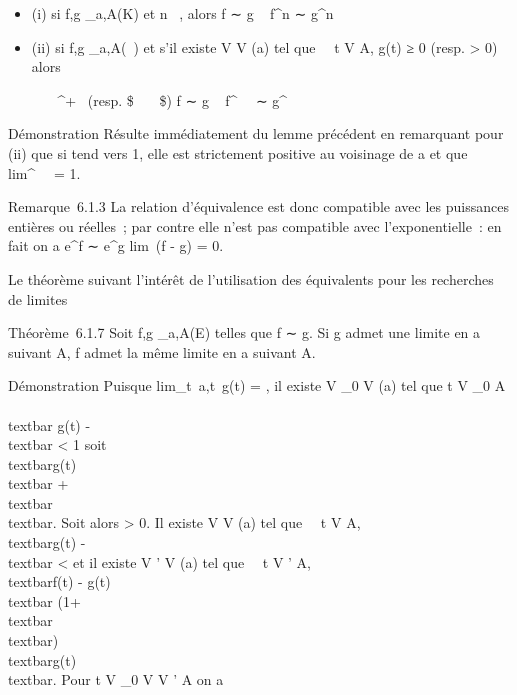 \documentclass[]{article}
\begin{document}
\begin{itemize}
\item
  (i) si f,g \_a,A(K) et n \in {}~, alors f ∼ g \rigtharrow~ f^n ∼
  g^n
\item
  (ii) si f,g \_a,A(~) et s'il existe V \in V (a) tel que
  \forall~~t \in V \bigcap A, g(t) ≥ 0 (resp. \textgreater{}
  0) alors

  \forall~\alpha~ \in {}~^+~\text
  (resp. \$\forall~\alpha~ \in {}~\$) f ∼ g \rigtharrow~ f^\alpha~~
  ∼ g^\alpha~
\end{itemize}

Démonstration Résulte immédiatement du lemme précédent en remarquant
pour (ii) que si \phi tend vers 1, elle est strictement positive au
voisinage de a et que lim\phi^\alpha~~ = 1.

Remarque~6.1.3 La relation d'équivalence est donc compatible avec les
puissances entières ou réelles~; par contre elle n'est pas compatible
avec l'exponentielle~: en fait on a e^f ∼ e^g
\Leftrightarrow lim~(f - g) = 0.

Le théorème suivant \jmathustifie l'intérêt de l'utilisation des équivalents
pour les recherches de limites

Théorème~6.1.7 Soit f,g \_a,A(E) telles que f ∼ g. Si g admet
une limite \ell en a suivant A, f admet la même limite en a suivant A.

Démonstration Puisque lim\_t\rightarrow~a,t\inA~g(t)
= \ell, il existe V \_0 \in V (a) tel que t \in V \_0 \bigcap A
\rigtharrow~\\textbar{} g(t) - \ell\\textbar{}
\textless{} 1 soit
\\textbar{}g(t)\\textbar{} 
+\\textbar{} \ell\\textbar{}. Soit alors \epsilon
\textgreater{} 0. Il existe V \in V (a) tel que
\forall~~t \in V \bigcap A, \\textbar{}g(t) -
\ell\\textbar{} \textless{} \epsilon {} et
il existe V ' \in V (a) tel que \forall~~t \in V ' \bigcap A,
\\textbar{}f(t) - g(t)\\textbar{} \leq \epsilon
{}(1+\\textbar{}\ell\\textbar{})
\\textbar{}g(t)\\textbar{}. Pour t \in V
\_0 \bigcap V \bigcap V ' \bigcap A on a
\end{document}
